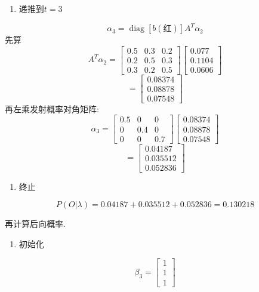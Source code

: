 \begin{enumerate}
\item[3.] 递推到$t=3$
\end{enumerate}
\[
\alpha_3 = \operatorname{diag}[b(\text{红})] A^T \alpha_2
\]
先算
\[
A^T \alpha_2
    =
    \begin{bmatrix}0.5 & 0.3 & 0.2 \\ 0.2 & 0.5 & 0.3 \\ 0.3 & 0.2 & 0.5\end{bmatrix}
    \begin{bmatrix}0.077 \\ 0.1104 \\ 0.0606\end{bmatrix}
\]
\[
= \begin{bmatrix}0.08374 \\ 0.08878 \\ 0.07548\end{bmatrix}
\]
再左乘发射概率对角矩阵:
\[
\alpha_3
    =
    \begin{bmatrix}0.5 & 0 & 0 \\ 0 & 0.4 & 0 \\ 0 & 0 & 0.7\end{bmatrix}
    \begin{bmatrix}0.08374 \\ 0.08878 \\ 0.07548\end{bmatrix}
\]
\[
= \begin{bmatrix}0.04187 \\ 0.035512 \\ 0.052836\end{bmatrix}
\]

\begin{enumerate}
\item[4.] 终止
\end{enumerate}
\[
P(O | \lambda)
    = 0.04187 + 0.035512 + 0.052836
    = 0.130218
\]

再计算后向概率.

\begin{enumerate}
\item[1.] 初始化
\end{enumerate}
\[
\beta_3 = \begin{bmatrix}1 \\ 1 \\ 1\end{bmatrix}
\]

